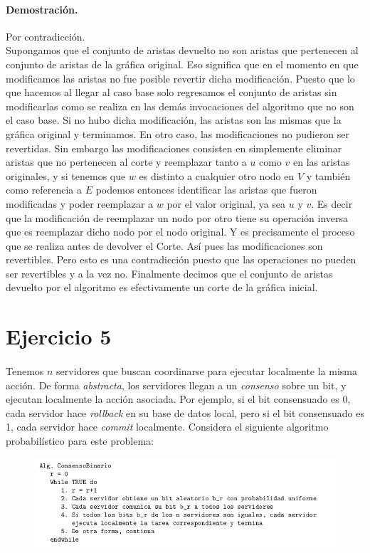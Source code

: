 \documentclass[12pt]{article}
\begin{document}
\paragraph{Demostración.} Por contradicción.\\
Supongamos que el conjunto de aristas devuelto no son aristas que pertenecen al conjunto de aristas de la gráfica original. Eso significa que en el momento en que modificamos las aristas no fue posible revertir dicha modificación. Puesto que lo que hacemos al llegar al caso base solo regresamos el conjunto de aristas sin modificarlas como se realiza en las demás invocaciones del algoritmo que no son el caso base. Si no hubo dicha modificación, las aristas son las mismas que la gráfica original y terminamos. En otro caso, las modificaciones no pudieron ser revertidas. Sin embargo las modificaciones consisten en simplemente eliminar aristas que no pertenecen al corte y reemplazar tanto a $u$ como $v$ en las aristas originales, y si tenemos que $w$ es distinto a cualquier otro nodo en $V$ y también como referencia a $E$ podemos entonces identificar las aristas que fueron modificadas y poder reemplazar a $w$ por el valor original, ya sea $u$ y $v$. Es decir que la modificación de reemplazar un nodo por otro tiene su operación inversa que es reemplazar dicho nodo por el nodo original. Y es precisamente el proceso que se realiza antes de devolver el Corte. Así pues las modificaciones son revertibles. Pero esto es una contradicción puesto que las operaciones no pueden ser revertibles y a la vez no. Finalmente decimos que el conjunto de aristas devuelto por el algoritmo es efectivamente un corte de la gráfica inicial.
\section{Ejercicio 5}
\paragraph{} Tenemos $n$ servidores que buscan coordinarse para ejecutar localmente la misma acción. De forma \textit{abstracta}, los servidores llegan a un \textit{consenso} sobre un bit, y ejecutan localmente la acción asociada. Por ejemplo, si el bit consensuado es 0, cada servidor hace \textit{rollback} en su base de datos local, pero si el bit consensuado es 1, cada servidor hace \textit{commit} localmente. Considera el siguiente algoritmo probabilístico para este problema:
\begin{figure}[h]
	\begin{center}
		\includegraphics[width=\textwidth]{AlgoProba}
	\end{center}
\end{figure}
\end{document}
